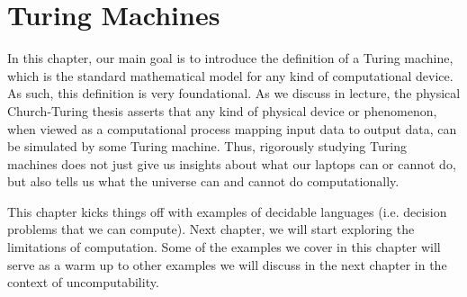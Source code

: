 \chapter{Turing Machines}
\label{chapter:Turing-Machines}

\begin{preamble}
\label{prmbl:Turing-Machines::main}
In this chapter, our main goal is to introduce the definition of a Turing machine, which is the standard mathematical model for any kind of computational device. As such, this definition is very foundational. As we discuss in lecture, the physical Church-Turing thesis asserts that any kind of physical device or phenomenon, when viewed as a computational process mapping input data to output data, can be simulated by some Turing machine. Thus, rigorously studying Turing machines does not just give us insights about what our laptops can or cannot do, but also tells us what the universe can and cannot do computationally. 

This chapter kicks things off with examples of decidable languages (i.e. decision problems that we can compute). Next chapter, we will start exploring the limitations of computation. Some of the examples we cover in this chapter will serve as a warm up to other examples we will discuss in the next chapter in the context of uncomputability.

\end{preamble}


